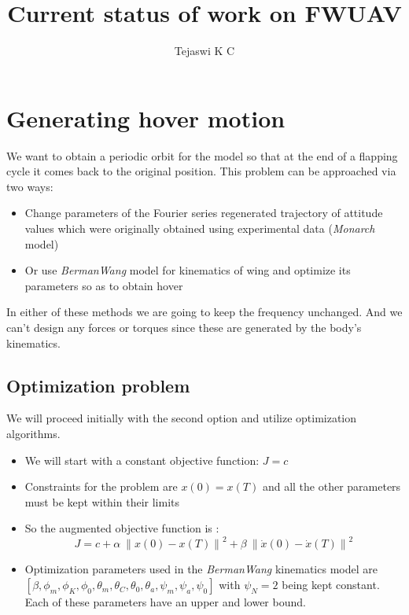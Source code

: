 \documentclass[10pt]{article}
\date{}
\author{Tejaswi K C}
\title{Current status of work on FWUAV}
\newcommand{\norm}[1]{\ensuremath{\left\| #1 \right\|}}
\begin{document}
\maketitle

\section{Generating hover motion}
We want to obtain a periodic orbit for the model so that at the end of a flapping cycle it comes back to the original position. This problem can be approached via two ways:
\begin{itemize}
	\item Change parameters of the Fourier series regenerated trajectory of attitude values which were originally obtained using experimental data (\textit{Monarch} model)
	\item Or use \textit{BermanWang} model for kinematics of wing and optimize its parameters so as to obtain hover
\end{itemize}
In either of these methods we are going to keep the frequency unchanged. And we can't design any forces or torques since these are generated by the body's kinematics.

\subsection{Optimization problem}
We will proceed initially with the second option and utilize optimization algorithms.
\begin{itemize}
	\item We will start with a constant objective function: $ J = c $
	\item Constraints for the problem are $ x(0) = x(T) $ and all the other parameters must be kept within their limits
	\item So the augmented objective function is :
	\[ J = c + \alpha\ \norm{x(0) - x(T)}^2 + \beta\ \norm{\dot{x}(0) - \dot{x}(T)}^2 \]
	\item Optimization parameters used in the \textit{BermanWang} kinematics model are $ [\beta, \phi_m, \phi_K, \phi_0, \theta_m, \theta_C, \theta_0, \theta_a, \psi_m, \psi_a, \psi_0] $ with $ \psi_N = 2 $ being kept constant. Each of these parameters have an upper and lower bound.
\end{itemize}

\end{document}
